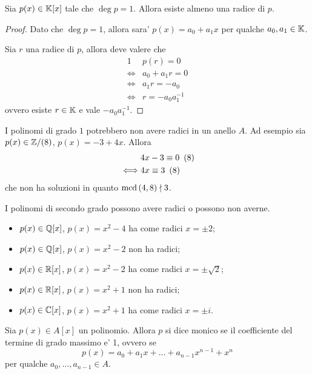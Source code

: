 \begin{proposition}
    Sia $p(x) \in \mathbb{K}[x]$ tale che $\deg p = 1$. Allora esiste almeno una radice di $p$.
\end{proposition}
\begin{proof}
    Dato che $\deg p = 1$, allora sara' $p(x) = a_0 + a_1x$ per qualche $a_0, a_1 \in \mathbb{K}$.

    Sia $r$ una radice di $p$, allora deve valere che \begin{alignat*}
        {1}
        &p(r) = 0 \\
        \iff &a_0 + a_1r = 0 \\
        \iff &a_1r = -a_0 \\
        \iff &r = -a_0a_1^{-1}
    \end{alignat*}
    ovvero esiste $r \in \mathbb{K}$ e vale $-a_0a_1^{-1}$.
\end{proof}

\begin{remark}
    I polinomi di grado $1$ potrebbero non avere radici in un anello $A$. Ad esempio sia $p(x) \in \mathbb{Z}/(8)$, $p(x) = -3 + 4x$. Allora \begin{alignat*}
        {1}
        &4x - 3\equiv 0 \ \left(8\right) \\
        \iff &4x \equiv 3 \ \left(8\right)
    \end{alignat*}
    che non ha soluzioni in quanto $\operatorname{mcd}\left(4, 8\right) \nmid 3$.
\end{remark}

\begin{remark}
    I polinomi di secondo grado possono avere radici o possono non averne.
    \begin{itemize}
        \item $p(x) \in \mathbb{Q}[x]$, $p(x) = x^2 - 4$ ha come radici $x = \pm 2$;
        \item $p(x) \in \mathbb{Q}[x]$, $p(x) = x^2 - 2$ non ha radici;
        \item $p(x) \in \mathbb{R}[x]$, $p(x) = x^2 - 2$ ha come radici $x = \pm \sqrt{2}$;
        \item $p(x) \in \mathbb{R}[x]$, $p(x) = x^2 + 1$ non ha radici;        \item $p(x) \in \mathbb{C}[x]$, $p(x) = x^2 + 1$ ha come radici $x = \pm i$.
    \end{itemize}
\end{remark}

\begin{definition}
    Sia $p(x) \in A[x]$ un polinomio. Allora $p$ si dice monico se il coefficiente del termine di grado massimo e' 1, ovvero se \[
        p(x) = a_0 + a_1x + \dots + a_{n-1}x^{n-1} + x^n    
    \] per qualche $a_0, \dots, a_{n-1} \in A$.
\end{definition}

